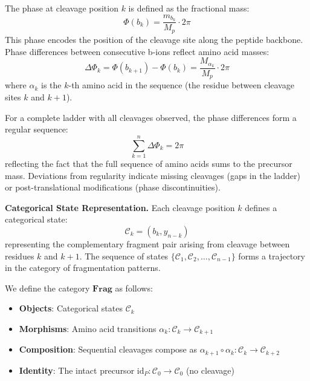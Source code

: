 \documentclass[11pt,twocolumn]{article}
\begin{document}
The phase at cleavage position $k$ is defined as the fractional mass:
\begin{equation}
    \Phi(b_k) = \frac{m_{b_k}}{M_p} \cdot 2\pi
    \label{eq:phase}
\end{equation}
This phase encodes the position of the cleavage site along the peptide backbone. Phase differences between consecutive b-ions reflect amino acid masses:
\begin{equation}
    \Delta\Phi_k = \Phi(b_{k+1}) - \Phi(b_k) = \frac{M_{\alpha_k}}{M_p} \cdot 2\pi
    \label{eq:phase_diff}
\end{equation}
where $\alpha_k$ is the $k$-th amino acid in the sequence (the residue between cleavage sites $k$ and $k+1$).

For a complete ladder with all cleavages observed, the phase differences form a regular sequence:
\begin{equation}
    \sum_{k=1}^{n} \Delta\Phi_k = 2\pi
\end{equation}
reflecting the fact that the full sequence of amino acids sums to the precursor mass. Deviations from regularity indicate missing cleavages (gaps in the ladder) or post-translational modifications (phase discontinuities).

\textbf{Categorical State Representation.} Each cleavage position $k$ defines a categorical state:
\begin{equation}
    \mathcal{C}_k = (b_k, y_{n-k})
    \label{eq:categorical_state}
\end{equation}
representing the complementary fragment pair arising from cleavage between residues $k$ and $k+1$. The sequence of states $\{\mathcal{C}_1, \mathcal{C}_2, \ldots, \mathcal{C}_{n-1}\}$ forms a trajectory in the category of fragmentation patterns.

We define the category $\mathbf{Frag}$ as follows:
\begin{itemize}[leftmargin=*]
    \item \textbf{Objects}: Categorical states $\mathcal{C}_k$
    \item \textbf{Morphisms}: Amino acid transitions $\alpha_k: \mathcal{C}_k \rightarrow \mathcal{C}_{k+1}$
    \item \textbf{Composition}: Sequential cleavages compose as $\alpha_{k+1} \circ \alpha_k: \mathcal{C}_k \rightarrow \mathcal{C}_{k+2}$
    \item \textbf{Identity}: The intact precursor $\text{id}_P: \mathcal{C}_0 \rightarrow \mathcal{C}_0$ (no cleavage)
\end{itemize}
\end{document}
